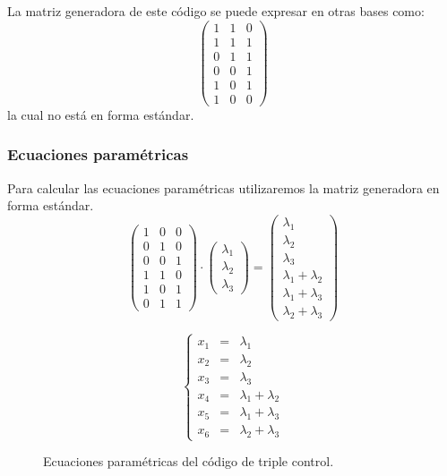 La matriz generadora de este c\'odigo se puede expresar en otras bases como:
\begin{displaymath}
\left( \begin{array}{ccc}
1&1&0\\
1&1&1\\
0&1&1\\
0&0&1\\
1&0&1\\
1&0&0
\end{array} \right)
\end{displaymath}
la cual no est\'a en forma est\'andar.

\subsubsection{Ecuaciones param\'etricas}

Para calcular las ecuaciones param\'etricas utilizaremos la matriz generadora
en forma est\'andar.
\begin{displaymath}
\left( \begin{array}{ccc}
1&0&0\\
0&1&0\\
0&0&1\\
1&1&0\\
1&0&1\\
0&1&1
\end{array} \right)  \cdot
\left( \begin{array}{c}
\lambda_1\\
\lambda_2\\
\lambda_3
\end{array} \right) =
\left( \begin{array}{c}
\lambda_1\\
\lambda_2\\
\lambda_3\\
\lambda_1+\lambda_2\\
\lambda_1+\lambda_3\\
\lambda_2+\lambda_3
\end{array} \right)
\end{displaymath}
\begin{figure}[!h]
\begin{displaymath}
\left\{ \begin{array}{ccl}
x_1&=&\lambda_1\\
x_2&=&\lambda_2\\
x_3&=&\lambda_3\\
x_4&=&\lambda_1+\lambda_2\\
x_5&=&\lambda_1+\lambda_3\\
x_6&=&\lambda_2+\lambda_3
\end{array} \right.
\end{displaymath}
\caption{Ecuaciones param\'etricas del c\'odigo de triple control.}
\end{figure}
%
\newpage
%
